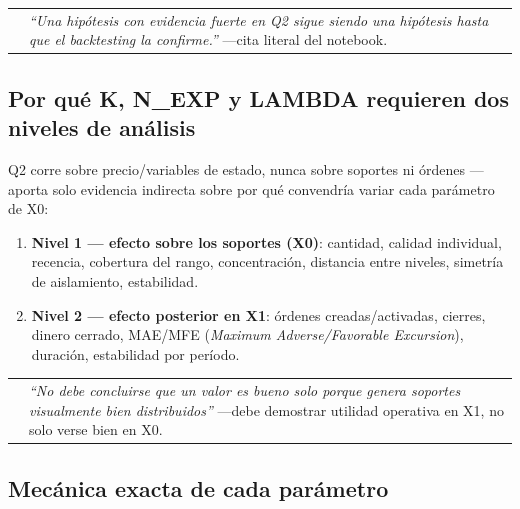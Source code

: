 \documentclass[11pt,a4paper]{article}
\makeatletter
\newenvironment{clave}{%
  \par\medskip\noindent
  \begin{tabular}{@{}p{0.4em}@{\hspace{8pt}}p{\dimexpr\linewidth-2em\relax}@{}}
  \textcolor{cmorado}{\rule{3pt}{1.1em}} &
}{\end{tabular}\par\medskip}
\newenvironment{advertencia}{%
  \par\medskip\noindent
  \begin{tabular}{@{}p{0.4em}@{\hspace{8pt}}p{\dimexpr\linewidth-2em\relax}@{}}
  \textcolor{crojo}{\rule{3pt}{1.1em}} &
}{\end{tabular}\par\medskip}
\newcommand{\dq}[1]{\emph{``#1''}}
\makeatother
\begin{document}
\begin{clave}
\dq{Una hipótesis con evidencia fuerte en Q2 sigue siendo una hipótesis hasta que el
backtesting la confirme.} —cita literal del notebook.
\end{clave}

\subsection{Por qué K, N\_EXP y LAMBDA requieren dos niveles de análisis}

Q2 corre sobre precio/variables de estado, nunca sobre soportes ni órdenes — aporta solo
evidencia indirecta sobre por qué convendría variar cada parámetro de X0:

\begin{enumerate}[leftmargin=1.4em,itemsep=2pt]
\item \textbf{Nivel 1 — efecto sobre los soportes (X0)}: cantidad, calidad individual,
  recencia, cobertura del rango, concentración, distancia entre niveles, simetría de
  aislamiento, estabilidad.
\item \textbf{Nivel 2 — efecto posterior en X1}: órdenes creadas/activadas, cierres,
  dinero cerrado, MAE/MFE (\emph{Maximum Adverse/Favorable Excursion}), duración,
  estabilidad por período.
\end{enumerate}

\begin{advertencia}
\dq{No debe concluirse que un valor es bueno solo porque genera soportes visualmente bien
distribuidos} —debe demostrar utilidad operativa en X1, no solo verse bien en X0.
\end{advertencia}

\subsection{Mecánica exacta de cada parámetro}
\end{document}
